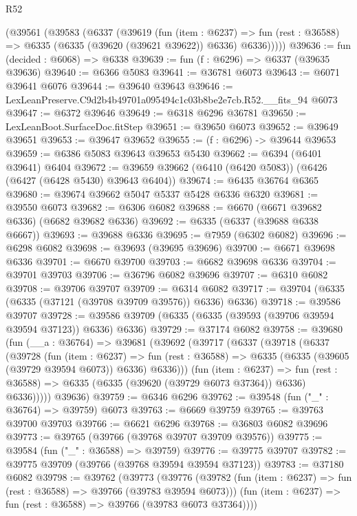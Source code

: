 \begin{lexlean}{R52}
\begin{coremodule}
    (@39561
      (@39583
        (@6337
          (@39619
            (fun (item : @6237) =>
            fun (rest : @36588) => @6335 (@6335 (@39620 (@39621 @39622)) @6336) @6336)))))
@39636 := fun (decided : @6068) => @6338
@39639 := fun (f : @6296) => @6337 (@39635 @39636)
@39640 := @6366 @5083
@39641 := @36781 @6073
@39643 := @6071 @39641 @6076
@39644 := @39640 @39643
@39646 := LexLeanPreserve.C9d2b4b49701a095494c1c03b8be2e7cb.R52.__fits_94 @6073
@39647 := @6372 @39646
@39649 := @6318 @6296 @36781
@39650 := LexLeanBoot.SurfaceDoc.fitStep
@39651 := @39650 @6073
@39652 := @39649 @39651
@39653 := @39647 @39652
@39655 := (f : @6296) -> @39644 @39653
@39659 := @6386 @5083 @39643 @39653 @5430
@39662 := @6394 (@6401 @39641) @6404
@39672 := @39659 @39662 (@6410 (@6420 @5083)) (@6426 (@6427 (@6428 @5430) @39643 @6404))
@39674 := @6435 @36764 @6365
@39680 := @39674 @39662 @5047 @5337 @5428 @6336 @6320
@39681 := @39550 @6073
@39682 := @6306 @6082
@39688 := @6670 (@6671 @39682 @6336) (@6682 @39682 @6336)
@39692 := @6335 (@6337 (@39688 @6338 @6667))
@39693 := @39688 @6336
@39695 := @7959 (@6302 @6082)
@39696 := @6298 @6082
@39698 := @39693 (@39695 @39696)
@39700 := @6671 @39698 @6336
@39701 := @6670 @39700
@39703 := @6682 @39698 @6336
@39704 := @39701 @39703
@39706 := @36796 @6082 @39696
@39707 := @6310 @6082
@39708 := @39706 @39707
@39709 := @6314 @6082
@39717 := @39704 (@6335 (@6335 (@37121 (@39708 @39709 @39576)) @6336) @6336)
@39718 := @39586 @39707
@39728 := @39586 @39709 (@6335 (@6335 (@39593 (@39706 @39594 @39594 @37123)) @6336) @6336)
@39729 := @37174 @6082
@39758 := @39680
    (fun (__a : @36764) =>
    @39681
      (@39692
        (@39717
          (@6337
            (@39718
              (@6337
                (@39728
                  (fun (item : @6237) =>
                  fun (rest : @36588) => @6335 (@6335 (@39605 (@39729 @39594 @6073)) @6336) @6336)))
              (fun (item : @6237) =>
              fun (rest : @36588) => @6335 (@6335 (@39620 (@39729 @6073 @37364)) @6336) @6336)))))
      @39636)
@39759 := @6346 @6296
@39762 := @39548 (fun ("_" : @36764) => @39759) @6073
@39763 := @6669 @39759
@39765 := @39763 @39700 @39703
@39766 := @6621 @6296
@39768 := @36803 @6082 @39696
@39773 := @39765 (@39766 (@39768 @39707 @39709 @39576))
@39775 := @39584 (fun ("_" : @36588) => @39759)
@39776 := @39775 @39707
@39782 := @39775 @39709 (@39766 (@39768 @39594 @39594 @37123))
@39783 := @37180 @6082
@39798 := @39762
    (@39773
      (@39776
        (@39782 (fun (item : @6237) => fun (rest : @36588) => @39766 (@39783 @39594 @6073)))
        (fun (item : @6237) => fun (rest : @36588) => @39766 (@39783 @6073 @37364))))

\end{coremodule}
\end{lexlean}
